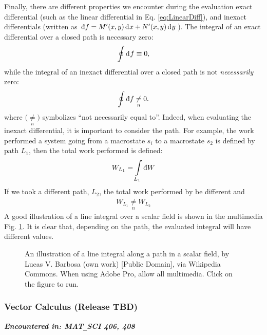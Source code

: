 Finally, there are different properties we encounter during the evaluation exact differential (such as the linear differential in Eq. \ref{eq:LinearDiff}), and inexact differentials (written as $\text{\dj}f = M'(x,y) \Diff{}{x} + N'(x,y) \Diff{}{y}$). The integral of an exact differential over a closed path is necessary zero:
%
\begin{align}
	\oint\mathop{}\!\mathrm{d^{}}{f} \equiv 0,
\end{align}
%
while the integral of an inexact differential over a closed path is not \emph{necessarily} zero:
%
\begin{align}
	\oint\text{\dj}f\underset{n}{\neq} 0.
\end{align}
%
where $\Big(\underset{n}{\neq}\Big)$ symbolizes ``not necessarily equal to''. Indeed, when evaluating the inexact differential, it is important to consider the path. For example, the work performed a system going from a macrostate $s_i$ to a macrostate $s_2$ is defined by path $L_{1}$, then the total work performed is defined:
%
\begin{align}
	W_{L_{1}} =  \int\limits_{L_{1}} \text{\dj}W
\end{align}
%
If we took a different path, $L_{2}$, the total work performed by be different and
%
\begin{align}
	W_{L_{1}} \underset{n}{\neq}  W_{L_{2}}
\end{align}
%
A good illustration of a line integral over a scalar field is shown in the multimedia Fig. \ref{fig:LineIntegral}. It is clear that, depending on the path, the evaluated integral will have different values.

\begin{figure}%
	\centering
	\caption{An illustration of a line integral along a path in a scalar field, by Lucas V. Barbosa (own work) [Public Domain], via Wikipedia Commons. When using Adobe Pro, allow all multimedia. Click on the figure to run.}%
	\label{fig:LineIntegral}%
\end{figure}

	\subsubsection{Vector Calculus \hfill(Release TBD)}
	
	\textit{\textbf{Encountered in: MAT\texttt{\_}SCI 406, 408}} 